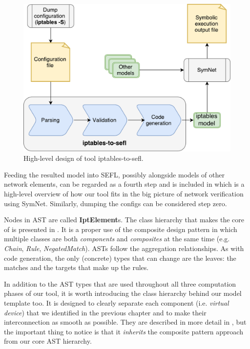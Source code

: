 \begin{figure}[h]
  \centering
  \captionsetup{justification=centering}
  \includegraphics[scale=0.5]{src/img/high-level-design}
  \caption{High-level design of tool iptables-to-sefl.}
  \label{fig:high-level-design}
\end{figure}

Feeding the resulted model into SEFL, possibly alongside models of other
network elements, can be regarded as a fourth step and is included in
 which is a high-level overview of
how our tool fits in the big picture of network verification using SymNet.
Similarly, dumping the configs can be considered step zero.

Nodes in AST are called \textbf{IptElement}s.  The class hierarchy that makes
the core of \TOOL is presented in .
It is a proper use of the composite design pattern in which multiple classes
are both \emph{components} and \emph{composites} at the same time (e.g.
\emph{Chain}, \emph{Rule}, \emph{NegatedMatch}).  ASTs follow the aggregation
relationships.  As with code generation, the only (concrete) types that can
change are the leaves: the matches and the targets that make up the rules.

In addition to the AST types that are used throughout all three computation
phases of our tool, it is worth introducing the class hierarchy behind our
model template too.  It is designed to clearly separate each component (i.e.
\emph{virtual device}) that we identified in the previous chapter and to make
their interconnection as smooth as possible. They are described in more detail
in , but the important thing to notice is
that it \emph{inherits} the composite pattern approach from our core AST
hierarchy.

